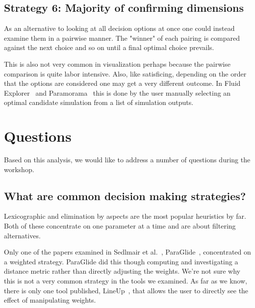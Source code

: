 \subsection{Strategy 6: Majority of confirming
dimensions}\label{majority-of-confirming-dimensions}

As an alternative to looking at all decision options at once one could 
instead examine them in a pairwise manner. The "winner" of each pairing is
compared against the next choice and so on until a final optimal choice
prevails.

This is also not very common in visualization perhaps because the pairwise
comparison is quite labor intensive. Also, like satisficing, depending on the
order that the options are considered one may get a very different outcome. In
Fluid Explorer~\cite{Bruckner:2010} and Paramorama~\citep{Pretorius:2011} this
is done by the user manually selecting an optimal candidate simulation from 
a list of simulation outputs.


\section{Questions}\label{questions}

Based on this analysis, we would like to address a number of questions during the workshop.

\subsection{What are common decision making strategies?}

Lexicographic and elimination by aspects are the most popular heuristics
by far. Both of these concentrate on one parameter at a time and are
about filtering alternatives.

Only one of the papers examined in Sedlmair et al.~\cite{Sedlmair:2014},
ParaGlide~\citep{Bergner:2013}, concentrated on a
weighted strategy. ParaGlide did this though computing and
investigating a distance metric rather than directly adjusting the
weights. We're not sure why this is not a very common strategy in the
tools we examined. As far as we know, there is only one tool published,
LineUp~\citep{Gratzl:2013}, that allows the user to directly see the
effect of manipulating weights.

